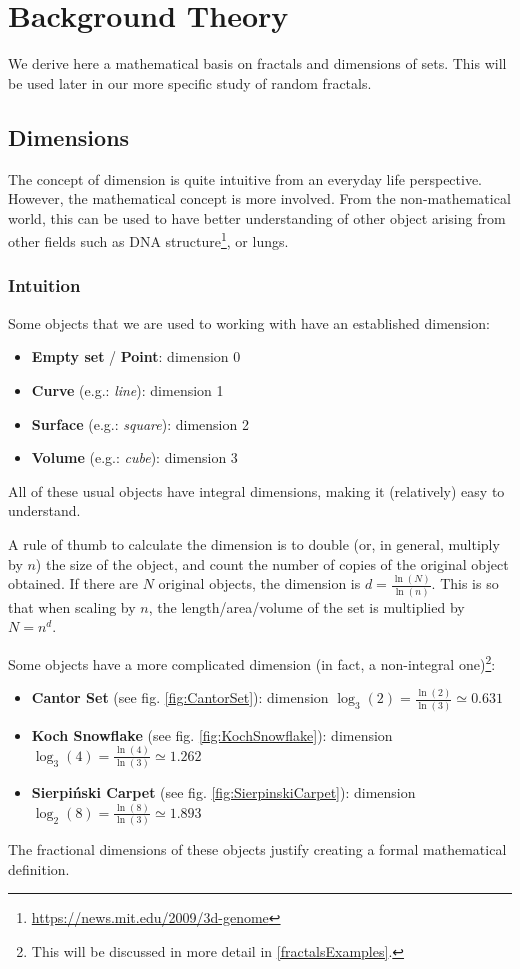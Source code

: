 \section{Background Theory}
We derive here a mathematical basis on fractals and dimensions of sets.
This will be used later in our more specific study of random fractals.

\subsection{Dimensions}
The concept of dimension is quite intuitive from an everyday life perspective.
However, the mathematical concept is more involved.
From the non-mathematical world, this can be used to have better understanding of other object arising from other fields such as DNA structure\footnote{\url{https://news.mit.edu/2009/3d-genome}}, or lungs\cite{IOLMSD_2009}.

\subsubsection{Intuition}
Some objects that we are used to working with have an established dimension:
\begin{itemize}
	\item \textbf{Empty set} / \textbf{Point}: dimension 0
	\item \textbf{Curve} (e.g.: \textit{line}): dimension 1
	\item \textbf{Surface} (e.g.: \textit{square}): dimension 2
	\item \textbf{Volume} (e.g.: \textit{cube}): dimension 3
\end{itemize}
All of these usual objects have integral dimensions, making it (relatively) easy to understand.

A rule of thumb to calculate the dimension is to double (or, in general, multiply by $n$) the size of the object, and count the number of copies of the original object obtained.
If there are $N$ original objects, the dimension is $d = \frac{\ln(N)}{\ln(n)}$.
This is so that when scaling by $n$, the length/area/volume of the set is multiplied by $N = n^d$.

Some objects have a more complicated dimension (in fact, a non-integral one)\footnote{This will be discussed in more detail in \ref{fractalsExamples}.}:
\begin{itemize}
	\item \textbf{Cantor Set} (see fig. \ref{fig:CantorSet}): dimension $\log_3(2) = \frac{\ln(2)}{\ln(3)} \simeq 0.631$
	\item \textbf{Koch Snowflake} (see fig. \ref{fig:KochSnowflake}): dimension $\log_3(4) = \frac{\ln(4)}{\ln(3)} \simeq 1.262$
	\item \textbf{Sierpiński Carpet} (see fig. \ref{fig:SierpinskiCarpet}): dimension $\log_2(8) = \frac{\ln(8)}{\ln(3)} \simeq 1.893$
\end{itemize}
The fractional dimensions of these objects justify creating a formal mathematical definition.

